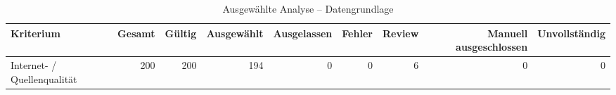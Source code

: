 \begin{table}[htbp]
\centering
\caption{Ausgewählte Analyse -- Datengrundlage}
\begin{tabular}{lrrrrrrrr}
\toprule
Kriterium & Gesamt & Gültig & Ausgewählt & Ausgelassen & Fehler & Review & Manuell ausgeschlossen & Unvollständig \\
\midrule
Internet- / Quellenqualität & 200 & 200 & 194 & 0 & 0 & 6 & 0 & 0 \\
\bottomrule
\end{tabular}
\end{table}
